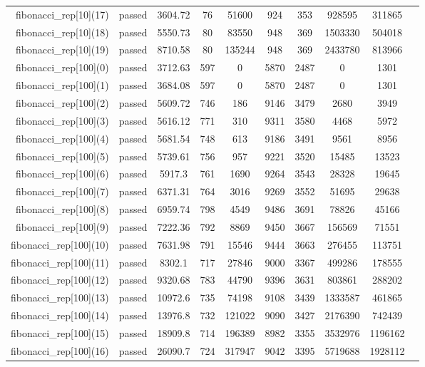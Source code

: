 \begin{longtable}{r|ccccccccc}
    fibonacci\_rep[10](17) & passed & 3604.72 & 76 & 51600 & 924 & 353 & 928595 & 311865 \\
    fibonacci\_rep[10](18) & passed & 5550.73 & 80 & 83550 & 948 & 369 & 1503330 & 504018 \\
    fibonacci\_rep[10](19) & passed & 8710.58 & 80 & 135244 & 948 & 369 & 2433780 & 813966 \\
    fibonacci\_rep[100](0) & passed & 3712.63 & 597 & 0 & 5870 & 2487 & 0 & 1301 \\
    fibonacci\_rep[100](1) & passed & 3684.08 & 597 & 0 & 5870 & 2487 & 0 & 1301 \\
    fibonacci\_rep[100](2) & passed & 5609.72 & 746 & 186 & 9146 & 3479 & 2680 & 3949 \\
    fibonacci\_rep[100](3) & passed & 5616.12 & 771 & 310 & 9311 & 3580 & 4468 & 5972 \\
    fibonacci\_rep[100](4) & passed & 5681.54 & 748 & 613 & 9186 & 3491 & 9561 & 8956 \\
    fibonacci\_rep[100](5) & passed & 5739.61 & 756 & 957 & 9221 & 3520 & 15485 & 13523 \\
    fibonacci\_rep[100](6) & passed & 5917.3 & 761 & 1690 & 9264 & 3543 & 28328 & 19645 \\
    fibonacci\_rep[100](7) & passed & 6371.31 & 764 & 3016 & 9269 & 3552 & 51695 & 29638 \\
    fibonacci\_rep[100](8) & passed & 6959.74 & 798 & 4549 & 9486 & 3691 & 78826 & 45166 \\
    fibonacci\_rep[100](9) & passed & 7222.36 & 792 & 8869 & 9450 & 3667 & 156569 & 71551 \\
    fibonacci\_rep[100](10) & passed & 7631.98 & 791 & 15546 & 9444 & 3663 & 276455 & 113751 \\
    fibonacci\_rep[100](11) & passed & 8302.1 & 717 & 27846 & 9000 & 3367 & 499286 & 178555 \\
    fibonacci\_rep[100](12) & passed & 9320.68 & 783 & 44790 & 9396 & 3631 & 803861 & 288202 \\
    fibonacci\_rep[100](13) & passed & 10972.6 & 735 & 74198 & 9108 & 3439 & 1333587 & 461865 \\
    fibonacci\_rep[100](14) & passed & 13976.8 & 732 & 121022 & 9090 & 3427 & 2176390 & 742439 \\
    fibonacci\_rep[100](15) & passed & 18909.8 & 714 & 196389 & 8982 & 3355 & 3532976 & 1196162 \\
    fibonacci\_rep[100](16) & passed & 26090.7 & 724 & 317947 & 9042 & 3395 & 5719688 & 1928112 \\

\end{longtable}

